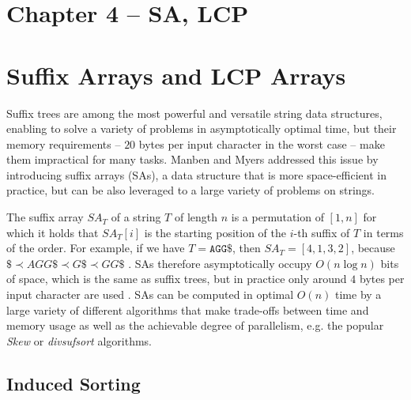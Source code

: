 \hypertarget{chapter-4-sa-lcp}{%
\section{Chapter 4 -- SA, LCP}\label{chapter-4-sa-lcp}}

\section{Suffix Arrays and LCP Arrays}
Suffix trees \cite{weiner1973linear} are among the most powerful and  versatile string data structures, enabling to solve a variety of problems in asymptotically optimal time, but their memory requirements -- $20$ bytes per input character in the worst case \cite{abouelhoda2004replacing} -- make them impractical for many tasks. Manben and Myers \cite{manber1993suffix} addressed this issue by introducing suffix arrays (SAs), a data structure that is more space-efficient in practice, but can be also leveraged to a large variety of problems on strings.

The suffix array $SA_T$ of a string $T$ of length $n$ is a permutation of $[1,n]$ for which it holds that $SA_T[i]$ is the starting position of the $i$-th suffix of $T$ in terms of the \lex{} order. For example, if we have $T = \texttt{AGG\$}$, then $SA_T = [4, 1, 3, 2]$, because $\$ \prec AGG\$ \prec G\$ \prec GG\$$ . SAs therefore asymptotically occupy $O(n \log n)$ bits of space, which is the same as suffix trees, but in practice only around $4$ bytes per input character are used \cite{abouelhoda2004replacing}. SAs can be computed in optimal $O(n)$ time by a large variety of different algorithms that make trade-offs between time and memory usage as well as the achievable degree of parallelism, e.g. the popular \textit{Skew} \cite{karkkainen2003simple} or \textit{divsufsort} \cite{fischer2017dismantling} algorithms.




\hypertarget{induced-sorting}{%
\subsection{Induced Sorting}\label{induced-sorting}}

